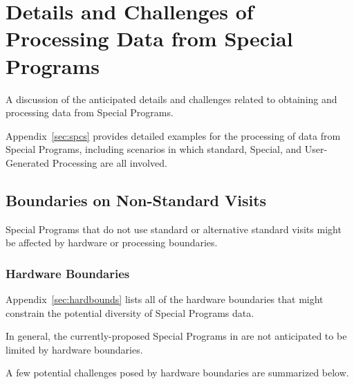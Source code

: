 \section{Details and Challenges of Processing Data from Special Programs}\label{sec:proc}

A discussion of the anticipated details and challenges related to 
obtaining and processing data from Special Programs.

Appendix~\ref{sec:spcs} provides detailed examples for the processing
of data from Special Programs, including scenarios in which standard,
Special, and User-Generated Processing are all involved.

\subsection{Boundaries on Non-Standard Visits} \label{ssec:proc_bounds}

Special Programs that do not use standard or alternative standard visits
might be affected by hardware or processing boundaries.

\subsubsection{Hardware Boundaries}\label{ssec:proc_bounds_hardware}

Appendix~\ref{sec:hardbounds} lists all of the hardware boundaries that 
might constrain the potential diversity of Special Programs data.

In general, the currently-proposed Special Programs in 
are not anticipated to be limited by hardware boundaries.

A few potential challenges posed by hardware
boundaries are summarized below.


